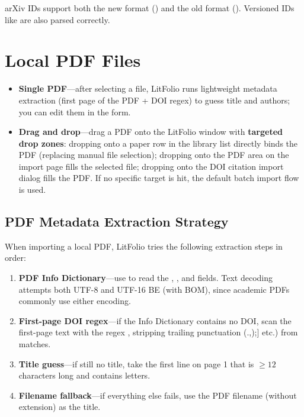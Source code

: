\begin{tipbox}
arXiv IDs support both the new format () and the old format
(). Versioned IDs like  are also parsed correctly.
\end{tipbox}

\section{Local PDF Files}


\begin{itemize}
  \item \textbf{Single PDF}---after selecting a file, LitFolio runs lightweight metadata
    extraction (first page of the PDF + DOI regex) to guess title and authors; you can
    edit them in the form.
  \item \textbf{Drag and drop}---drag a PDF onto the LitFolio window with
    \textbf{targeted drop zones}: dropping onto a paper row in the library list
    directly binds the PDF (replacing manual file selection); dropping onto the
    PDF area on the import page fills the selected file; dropping onto the DOI
    citation import dialog fills the PDF. If no specific target is hit, the
    default batch import flow is used.
\end{itemize}

\subsection{PDF Metadata Extraction Strategy}

When importing a local PDF, LitFolio tries the following extraction steps in order:

\begin{enumerate}
  \item \textbf{PDF Info Dictionary}---use  to read the ,
    , and  fields. Text decoding attempts both UTF-8 and
    UTF-16 BE (with BOM), since academic PDFs commonly use either encoding.
  \item \textbf{First-page DOI regex}---if the Info Dictionary contains no DOI, scan
    the first-page text with the regex ,
    stripping trailing punctuation (.,);] etc.) from matches.
  \item \textbf{Title guess}---if still no title, take the first line on page 1 that
    is $\geq 12$ characters long and contains letters.
  \item \textbf{Filename fallback}---if everything else fails, use the PDF filename
    (without extension) as the title.
\end{enumerate}

